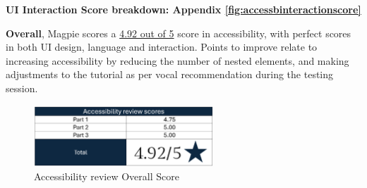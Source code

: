 \hspace{2em}\textbf{UI Interaction Score breakdown: Appendix
    \ref{fig:accessbinteractionscore}}

\textbf{Overall}, Magpie scores a \underline{4.92 out of 5} score in
accessibility, with perfect scores in both UI design, language and interaction.
Points to improve relate to increasing accessibility by reducing the number of
nested elements, and making adjustments to the tutorial as per vocal
recommendation during the testing session.

\begin{figure}[h!]
    \centering
    \includegraphics[width=0.6\textwidth]{images/accessb-survey-summary.png}
    \caption{Accessibility review \- Overall Score}
\end{figure}
